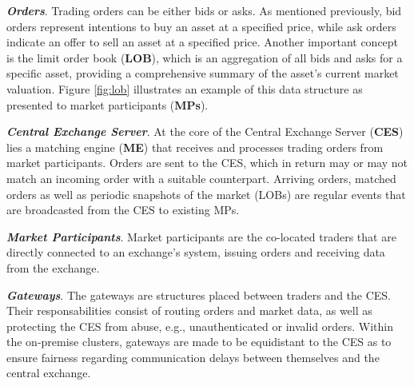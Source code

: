 \textbf{\textit{Orders}}.
    Trading orders can be either bids or asks. 
    As mentioned previously, bid orders represent intentions to buy an asset at a specified price, 
    while ask orders indicate an offer to sell an asset at a specified price. 
    Another important concept is the limit order book (\textbf{LOB}), which is an aggregation 
    of all bids and asks for a specific asset, providing a comprehensive summary of 
    the asset's current market valuation. 
    Figure \ref{fig:lob} illustrates an example of this data structure as presented to market participants (\textbf{MPs}).

\textbf{\textit{Central Exchange Server}}. At the core of the Central Exchange Server (\textbf{CES}) lies a 
    matching engine (\textbf{ME}) that receives and processes trading orders from 
    market participants. Orders are sent to the CES, which in return may or may not match 
    an incoming order with a suitable counterpart. Arriving orders, matched orders 
    as well as periodic snapshots of the market (LOBs) are regular events that are 
    broadcasted from the CES to existing MPs.

\textbf{\textit{Market Participants}}. Market participants are the co-located 
    traders that are directly connected to an exchange's system, issuing orders and 
    receiving data from the exchange.


\textbf{\textit{Gateways}}. The gateways are structures placed between traders
    and the CES. Their responsabilities consist of routing orders and market data, as 
    well as protecting the CES from abuse, e.g., unauthenticated or invalid orders. Within
    the on-premise clusters, gateways are made to be equidistant to the CES as to 
    ensure fairness regarding communication delays between themselves and the central exchange.

